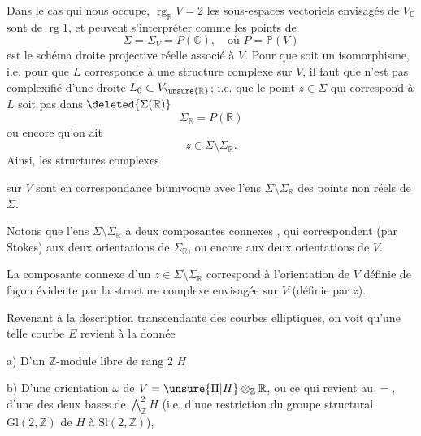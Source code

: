 Dans le cas qui nous occupe, $\operatorname{rg}_{\mathbb R}V=2$ les  sous-espaces vectoriels envisagés de $V_{\mathbb C}$ sont de  $\operatorname{rg}1$,  et peuvent s'interpréter comme les points de
\begin{equation}
\Sigma=\Sigma_V=P(\mathbb C),\quad\text{où }P=\mathbb P(V)
\tag{16}
\end{equation}
est le  schéma droite projective réelle associé à $V$. Pour que
soit un isomorphisme, i.e. pour que $L$ corresponde à une structure complexe  sur $V$, il faut que   n'est pas complexifié d'une droite $L_0\subset V_{\unsure{\mathbb R}}$; i.e. que le point $z\in\Sigma$ qui correspond à $L$  soit pas dans $\deleted{\Sigma(\mathbb R)}$
\[
\Sigma_{\mathbb R}=P(\mathbb R)
\]
ou encore qu'on ait
\begin{equation}
z\in\Sigma\setminus\Sigma_{\mathbb R}.
\tag{17}
\end{equation}
 Ainsi, les structures complexes

sur $V$ sont en correspondance biunivoque avec l'ens $\Sigma\setminus\Sigma_{\mathbb R}$ des points non réels de $\Sigma$.

Notons que l'ens $\Sigma\setminus\Sigma_{\mathbb R}$ a deux composantes connexes \inserted{$\Sigma_\omega^*$}, qui correspondent (par Stokes) aux deux orientations de $\Sigma_{\mathbb R}$, ou encore aux deux orientations de $V$.

La composante connexe d'un $z\in\Sigma\setminus\Sigma_{\mathbb R}$ correspond à l'orientation de $V$ définie de façon évidente par la structure complexe envisagée sur $V$ (définie par $z$).

Revenant à la description transcendante des courbes elliptiques, on voit qu'une telle courbe $E$ revient à la donnée

a) D'un $\mathbb Z$-module libre de rang $2$ $H$

b) D'une  orientation $\omega$ de $V=\unsure{\Pi|H}\otimes_{\mathbb Z}\mathbb R$, ou ce qui revient au $=$, d'une des deux bases de $\bigwedge_{\mathbb Z}^{2}H$ (i.e. d'une restriction du groupe structural $\mathrm{Gl}(2,\mathbb Z)$ de $H$ à $\mathrm{Sl}(2,\mathbb Z)$), 

